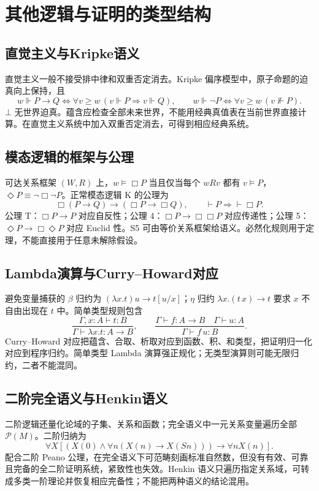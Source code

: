 \documentclass[../main.tex]{subfiles}
\begin{document}
\section{其他逻辑与证明的类型结构}
\subsection{直觉主义与Kripke语义}
直觉主义一般不接受排中律和双重否定消去。Kripke 偏序模型中，原子命题的迫真向上保持，且
\[
w\Vdash P\to Q\iff\forall v\ge w\,(v\Vdash P\Rightarrow v\Vdash Q),\qquad
w\Vdash\neg P\iff\forall v\ge w\,(v\nVdash P).
\]
$\bot$ 无世界迫真。蕴含应检查全部未来世界，不能用经典真值表在当前世界直接计算。在直觉主义系统中加入双重否定消去，可得到相应经典系统。
\subsection{模态逻辑的框架与公理}
可达关系框架 $(W,R)$ 上，$w\models\Box P$ 当且仅当每个 $wRv$ 都有 $v\models P$，$\Diamond P\equiv\neg\Box\neg P$。正常模态逻辑 K 的公理为
\[
\Box(P\to Q)\to(\Box P\to\Box Q),\qquad
\vdash P\Rightarrow\vdash\Box P.
\]
公理 T：$\Box P\to P$ 对应自反性；公理 4：$\Box P\to\Box\Box P$ 对应传递性；公理 5：$\Diamond P\to\Box\Diamond P$ 对应 Euclid 性。S5 可由等价关系框架给语义。必然化规则用于定理，不能直接用于任意未解除假设。
\subsection{Lambda演算与Curry--Howard对应}
避免变量捕获的 $\beta$ 归约为 $(\lambda x.t)u\to t[u/x]$；$\eta$ 归约 $\lambda x.(t\,x)\to t$ 要求 $x$ 不自由出现在 $t$ 中。简单类型规则包含
\[
\frac{\Gamma,x:A\vdash t:B}{\Gamma\vdash\lambda x.t:A\to B},\qquad
\frac{\Gamma\vdash f:A\to B\quad\Gamma\vdash u:A}{\Gamma\vdash f\,u:B}.
\]
Curry--Howard 对应把蕴含、合取、析取对应到函数、积、和类型，把证明归一化对应到程序归约。简单类型 Lambda 演算强正规化；无类型演算则可能无限归约，二者不能混同。
\subsection{二阶完全语义与Henkin语义}
二阶逻辑还量化论域的子集、关系和函数；完全语义中一元关系变量遍历全部 $\mathcal P(M)$。二阶归纳为
\[
\forall X[(X(0)\land\forall n(X(n)\to X(Sn)))\to\forall nX(n)].
\]
配合二阶 Peano 公理，在完全语义下可范畴刻画标准自然数，但没有有效、可靠且完备的全二阶证明系统，紧致性也失效。Henkin 语义只遍历指定关系域，可转成多类一阶理论并恢复相应完备性；不能把两种语义的结论混用。
\end{document}
